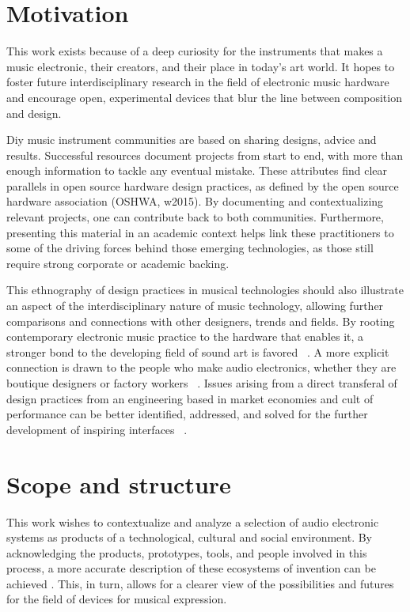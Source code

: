 \section{Motivation}

This work exists because of a deep curiosity for the instruments that makes a music electronic, their creators, and their place in today's art world. It hopes to foster future interdisciplinary research in the field of electronic music hardware and encourage open, experimental devices that blur the line between composition and design. 

Diy music instrument communities are based on sharing designs, advice and results. Successful resources document projects from start to end, with more than enough information to tackle any eventual mistake. These attributes find clear parallels in open source hardware design practices, as defined by the open source hardware association (OSHWA, w2015). By documenting and contextualizing relevant projects, one can contribute back to both communities. Furthermore, presenting this material in an academic context helps link these practitioners to some of the driving forces behind those emerging technologies, as those still require strong corporate or academic backing. 

This ethnography of design practices in musical technologies should also illustrate an aspect of the interdisciplinary nature of music technology, allowing further comparisons and connections with other designers, trends and fields. By rooting contemporary electronic music practice to the hardware that enables it, a stronger bond to the developing field of sound art is favored ~\cite{cluett2013}. A more explicit connection is drawn to the people who make audio electronics, whether they are boutique designers or factory workers ~\cite{rylan2015}.  Issues arising from a direct transferal of design practices from an engineering based in market economies and cult of performance can be better identified, addressed, and solved for the further development of inspiring interfaces ~\cite{ghazala2004,christensen2005,Feldman2007,silver2009,perner2011,hertz2012,riis2013,jackson2014}.

\section{Scope and structure}

This work wishes to contextualize and analyze a selection of audio electronic systems as products of a technological, cultural and social environment. By acknowledging the products, prototypes, tools, and people involved in this process, a more accurate description of these ecosystems of invention can be achieved \cite{vinck2003}. This, in turn, allows for a clearer view of the possibilities and futures for the field of devices for musical expression. 
	
